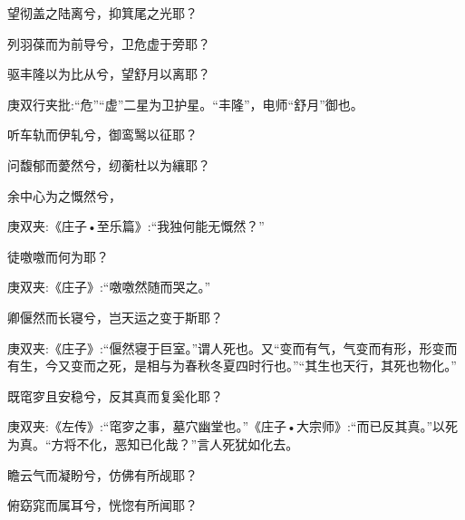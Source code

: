 \begin{qute2sp}
\begin{poem}
        \begin{pl}望彻盖之陆离兮，抑箕尾之光耶？\end{pl}

        \begin{pl}列羽葆而为前导兮，卫危虚于旁耶？\end{pl}

        \begin{pl}驱丰隆以为比从兮，望舒月以离耶？\end{pl}
        \begin{note}庚双行夹批:“危”“虚”二星为卫护星。“丰隆”，电师“舒月”御也。\end{note}

        \begin{pl}听车轨而伊轧兮，御鸾鹥以征耶？\end{pl}

        \begin{pl}问馥郁而薆然兮，纫蘅杜以为纕耶？\end{pl}

        \begin{pl}余中心为之慨然兮，\end{pl}
        \begin{note}庚双夹:《庄子•至乐篇》:“我独何能无慨然？”\end{note}徒噭噭而何为耶？
        \begin{note}庚双夹:《庄子》:“噭噭然随而哭之。”\end{note}

        \begin{pl}卿偃然而长寝兮，岂天运之变于斯耶？\end{pl}
        \begin{note}庚双夹:《庄子》:“偃然寝于巨室。”谓人死也。又“变而有气，气变而有形，形变而有生，今又变而之死，是相与为春秋冬夏四时行也。”“其生也天行，其死也物化。”\end{note}

        \begin{pl}既窀穸且安稳兮，反其真而复奚化耶？\end{pl}
        \begin{note}庚双夹:《左传》:“窀穸之事，墓穴幽堂也。”《庄子•大宗师》:“而已反其真。”以死为真。“方将不化，恶知已化哉？”言人死犹如化去。\end{note}

        \begin{pl}瞻云气而凝盼兮，仿佛有所觇耶？\end{pl}

        \begin{pl}俯窈窕而属耳兮，恍惚有所闻耶？\end{pl}


\end{poem}
\end{qute2sp}
